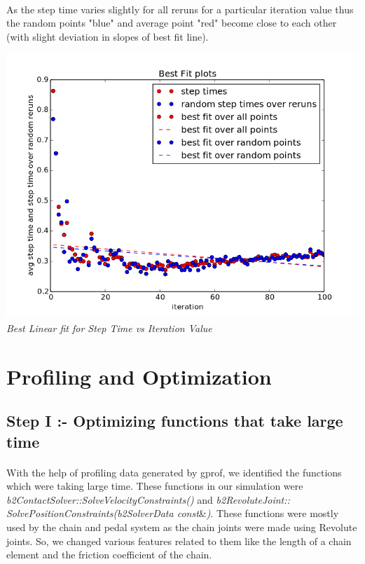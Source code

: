 \documentclass[11pt]{article}
\begin{document}
\paragraph{}
As the step time varies slightly for all reruns for a particular iteration value thus the random points "blue" 
and average point "red" become close to each other (with slight deviation in slopes of best fit line).
\begin{center}
 \includegraphics[scale = 0.4]{images/plots/plot05} \\
  \emph{Best Linear fit for Step Time vs Iteration Value} \\
\end{center}


\section{Profiling and Optimization}
\paragraph{}
\subsection{Step I :- Optimizing functions that take large time}
\paragraph{}
With the help of profiling data generated by gprof, we identified\cite{opt} the functions which were taking large time. These functions 
in our simulation were \textit{b2ContactSolver::SolveVelocityConstraints()} and 
\textit{b2RevoluteJoint:: SolvePositionConstraints(b2SolverData const}\&\textit{)}. These functions were mostly used by the chain and pedal system as 
the chain joints were made using Revolute joints. So, we changed various features related to them like the length of a chain element and 
the friction coefficient of the chain.
\end{document}
